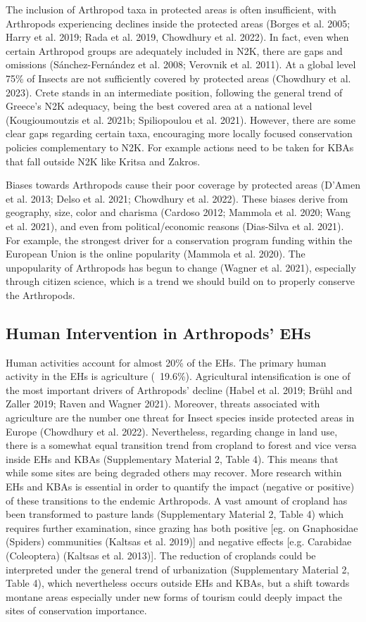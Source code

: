 The inclusion of Arthropod taxa in protected areas is often insufficient, with
Arthropods experiencing declines inside the protected areas (Borges et al. 2005; Harry et al. 2019; Rada et al. 2019, Chowdhury et al. 2022).
In fact, even when certain Arthropod groups are adequately included in N2K,
there are gaps and omissions (Sánchez-Fernández et al. 2008; Verovnik et al. 2011).
At a global level 75\% of Insects are not sufficiently covered by protected
areas (Chowdhury et al. 2023). Crete stands in an intermediate position,
following the general trend of Greece’s N2K adequacy, being the best covered
area at a national level (Kougioumoutzis et al. 2021b; Spiliopoulou et al. 2021).
However, there are some clear gaps regarding certain taxa, encouraging more
locally focused conservation policies complementary to N2K. For example actions
need to be taken for KBAs that fall outside N2K like Kritsa and Zakros.

Biases towards Arthropods cause their poor coverage by protected
areas (D’Amen et al. 2013; Delso et al. 2021; Chowdhury et al. 2022). These
biases derive from geography, size, color and charisma (Cardoso 2012; Mammola et al. 2020; Wang et al. 2021),
and even from political/economic reasons (Dias-Silva et al. 2021). For example,
the strongest driver for a conservation program funding within the European
Union is the online popularity (Mammola et al. 2020). The unpopularity of
Arthropods has begun to change (Wagner et al. 2021), especially through citizen
science, which is a trend we should build on to properly conserve the Arthropods.

    \subsection{Human Intervention in Arthropods’ EHs}
    \label{subsec:arthropods-human-intervention-ehs}
Human activities account for almost 20\% of the EHs. The primary human activity
in the EHs is agriculture (~19.6\%). Agricultural intensification is one of the
most important drivers of Arthropods’ decline (Habel et al. 2019; Brühl and Zaller 2019; Raven and Wagner 2021).
Moreover, threats associated with agriculture are the number one threat for
Insect species inside protected areas in Europe (Chowdhury et al. 2022).
Nevertheless, regarding change in land use, there is a somewhat equal
transition trend from cropland to forest and vice versa inside EHs and KBAs
(Supplementary Material 2, Table 4). This means that while some sites are being
degraded others may recover. More research within EHs and KBAs is essential in
order to quantify the impact (negative or positive) of these transitions to the
endemic Arthropods. A vast amount of cropland has been transformed to pasture
lands (Supplementary Material 2, Table 4) which requires further examination,
since grazing has both positive [eg. on Gnaphosidae (Spiders) communities (Kaltsas et al.  2019)]
and negative effects [e.g. Carabidae (Coleoptera) (Kaltsas et al. 2013)].
The reduction of croplands could be interpreted under the general trend of
urbanization (Supplementary Material 2, Table 4), which nevertheless occurs
outside EHs and KBAs, but a shift towards montane areas especially under new
forms of tourism could deeply impact the sites of conservation importance.
    
